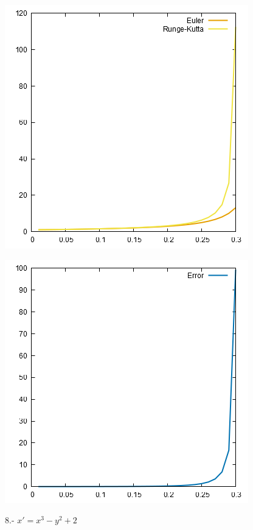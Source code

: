 \documentclass[10pt]{article}
\begin{document}
\begin{multicols}{2}
\begin{center}
				\includegraphics[scale=0.4]{../Graficas/7.png}
			\end{center}
			\begin{center}
				\includegraphics[scale=0.4]{../Graficas/7_1.png}
			\end{center}
			8.- $x'=x^3-y^2+2$
			\begin{center}

\end{center}
\end{multicols}
\end{document}
